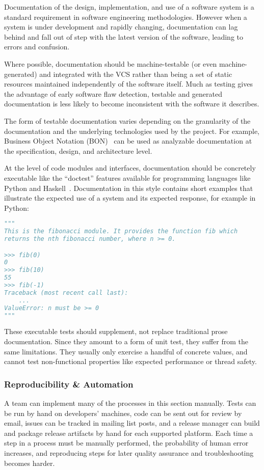 Documentation of the design, implementation, and use of a software
system is a standard requirement in software engineering
methodologies. However when a system is under development and rapidly
changing, documentation can lag behind and fall out of step with the
latest version of the software, leading to errors and confusion.

Where possible, documentation should be machine-testable (or even
machine-generated) and integrated with the VCS rather than being a set
of static resources maintained independently of the software
itself. Much as testing gives the advantage of early software flaw
detection, testable and generated documentation is less likely to
become inconsistent with the software it describes.

The form of testable documentation varies depending on the granularity
of the documentation and the underlying technologies used by the
project. For example, Business Object Notation
(BON)~\cite{walden1995seamless} can be used as analyzable
documentation at the specification, design, and architecture level.

At the level of code modules and interfaces, documentation should be
concretely executable like the ``doctest'' features available for
programming languages like Python and
Haskell~\cite{python3doctest}. Documentation in this style contains
short examples that illustrate the expected use of a system and its
expected response, for example in Python:

\begin{lstlisting}[language=Python]
"""
This is the fibonacci module. It provides the function fib which
returns the nth fibonacci number, where n >= 0.

>>> fib(0)
0
>>> fib(10)
55
>>> fib(-1)
Traceback (most recent call last):
    ...
ValueError: n must be >= 0
"""
\end{lstlisting}

These executable tests should supplement, not replace traditional
prose documentation. Since they amount to a form of unit test, they
suffer from the same limitations. They usually only exercise a handful
of concrete values, and cannot test non-functional properties like
expected performance or thread safety.

\subsubsection{Reproducibility \& Automation}

A team can implement many of the processes in this section
manually. Tests can be run by hand on developers' machines, code can
be sent out for review by email, issues can be tracked in mailing list
posts, and a release manager can build and package release artifacts
by hand for each supported platform. Each time a step in a process
must be manually performed, the probability of human error increases,
and reproducing steps for later quality assurance and troubleshooting
becomes harder.

